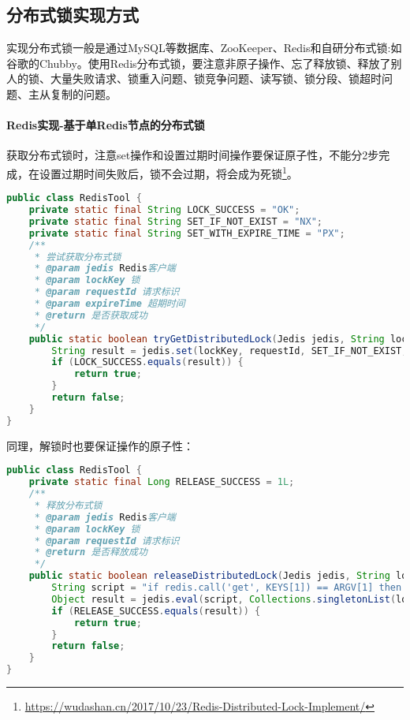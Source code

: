 \documentclass[../../../interview-questions.tex]{subfiles}
\begin{document}
\subsection{分布式锁实现方式}

实现分布式锁一般是通过MySQL等数据库、ZooKeeper、Redis和自研分布式锁:如谷歌的Chubby。使用Redis分布式锁，要注意非原子操作、忘了释放锁、释放了别人的锁、大量失败请求、锁重入问题、锁竞争问题、读写锁、锁分段、锁超时问题、主从复制的问题。

\paragraph{Redis实现-基于单Redis节点的分布式锁}

获取分布式锁时，注意set操作和设置过期时间操作要保证原子性，不能分2步完成，在设置过期时间失败后，锁不会过期，将会成为死锁\footnote{\url{https://wudashan.cn/2017/10/23/Redis-Distributed-Lock-Implement/}}。

\begin{lstlisting}[language=Java]
public class RedisTool {
    private static final String LOCK_SUCCESS = "OK";
    private static final String SET_IF_NOT_EXIST = "NX";
    private static final String SET_WITH_EXPIRE_TIME = "PX";
    /**
     * 尝试获取分布式锁
     * @param jedis Redis客户端
     * @param lockKey 锁
     * @param requestId 请求标识
     * @param expireTime 超期时间
     * @return 是否获取成功
     */
    public static boolean tryGetDistributedLock(Jedis jedis, String lockKey, String requestId, int expireTime) {
        String result = jedis.set(lockKey, requestId, SET_IF_NOT_EXIST, SET_WITH_EXPIRE_TIME, expireTime);
        if (LOCK_SUCCESS.equals(result)) {
            return true;
        }
        return false;
    }
}
\end{lstlisting}

同理，解锁时也要保证操作的原子性：

\begin{lstlisting}[language=Java]
public class RedisTool {
    private static final Long RELEASE_SUCCESS = 1L;
    /**
     * 释放分布式锁
     * @param jedis Redis客户端
     * @param lockKey 锁
     * @param requestId 请求标识
     * @return 是否释放成功
     */
    public static boolean releaseDistributedLock(Jedis jedis, String lockKey, String requestId) {
        String script = "if redis.call('get', KEYS[1]) == ARGV[1] then return redis.call('del', KEYS[1]) else return 0 end";
        Object result = jedis.eval(script, Collections.singletonList(lockKey), Collections.singletonList(requestId));
        if (RELEASE_SUCCESS.equals(result)) {
            return true;
        }
        return false;
    }
}
\end{lstlisting}
\end{document}
